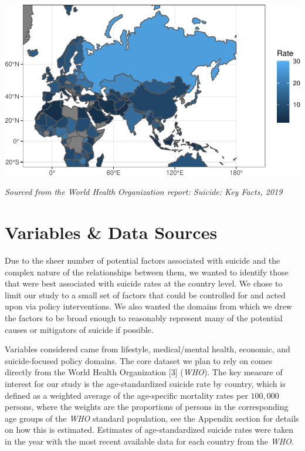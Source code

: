 \documentclass[]{article}
\begin{document}
\begin{center}\includegraphics{Project_Report_files/figure-latex/russia_map_plot-1} \end{center}

\emph{Sourced from the World Health Organization report: Suicide: Key
Facts, 2019}

\newpage 

\section{Variables \& Data Sources}\label{variables-data-sources}

Due to the sheer number of potential factors associated with suicide and
the complex nature of the relationships between them, we wanted to
identify those that were best associated with suicide rates at the
country level. We chose to limit our study to a small set of factors
that could be controlled for and acted upon via policy interventions. We
also wanted the domains from which we drew the factors to be broad
enough to reasonably represent many of the potential causes or
mitigators of suicide if possible.

Variables considered came from lifestyle, medical/mental health,
economic, and suicide-focused policy domains. The core dataset we plan
to rely on comes directly from the World Health Organization {[}3{]}
(\emph{WHO}). The key measure of interest for our study is the
age-standardized suicide rate by country, which is defined as a weighted
average of the age-specific mortality rates per \(100,000\) persons,
where the weights are the proportions of persons in the corresponding
age groups of the \emph{WHO} standard population, see the Appendix
section for details on how this is estimated. Estimates of
age-standardized suicide rates were taken in the year with the most
recent available data for each country from the \emph{WHO}.
\end{document}

